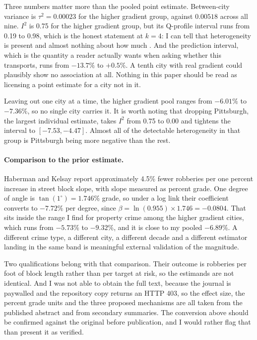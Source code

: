 \documentclass[11pt,letterpaper]{article}
\begin{document}
Three numbers matter more than the pooled point estimate. Between-city variance is
$\tau^2 = 0.00023$ for the higher gradient group, against $0.00518$ across all nine.
$I^2$ is 0.75 for the higher gradient group, but its Q-profile interval
\cite{viechtbauer2007} runs from 0.19 to 0.98, which is the honest statement at
$k=4$: I can tell that heterogeneity is present and almost nothing about how much
\cite{higgins2002}. And the prediction interval, which is the quantity a reader
actually wants when asking whether this transports, runs from $-13.7\%$ to
$+0.5\%$. A tenth city with real gradient could plausibly show no association at
all. Nothing in this paper should be read as licensing a point estimate for a city
not in it.

Leaving out one city at a time, the higher gradient pool ranges from $-6.01\%$ to
$-7.36\%$, so no single city carries it. It is worth noting that dropping
Pittsburgh, the largest individual estimate, takes $I^2$ from 0.75 to 0.00 and
tightens the interval to $[-7.53, -4.47]$. Almost all of the detectable
heterogeneity in that group is Pittsburgh being more negative than the rest.

\paragraph{Comparison to the prior estimate.} Haberman and Kelsay report approximately
4.5\% fewer robberies per one percent increase in street block slope, with slope
measured as percent grade. One degree of angle is $\tan(1^\circ) = 1.746\%$ grade, so
under a log link their coefficient converts to $-7.72\%$ per degree, since
$\beta = \ln(0.955) \times 1.746 = -0.0804$. That sits inside the range I find for
property crime among the higher gradient cities, which runs from $-5.73\%$ to
$-9.32\%$, and it is close to my pooled $-6.89\%$. A different crime type, a different
city, a different decade and a different estimator landing in the same band is
meaningful external validation of the magnitude.

Two qualifications belong with that comparison. Their outcome is robberies per foot of
block length rather than per target at risk, so the estimands are not identical. And I
was not able to obtain the full text, because the journal is paywalled and the
repository copy returns an HTTP 403, so the effect size, the percent grade units and
the three proposed mechanisms are all taken from the published abstract and from
secondary summaries. The conversion above should be confirmed against the original
before publication, and I would rather flag that than present it as verified.
\end{document}
